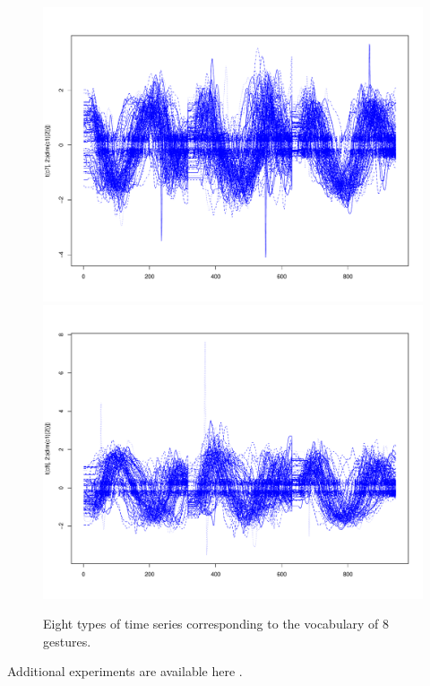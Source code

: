 \begin{figure}
\includegraphics[scale=0.1]{images/c7}
\includegraphics[scale=0.1]{images/c8}

\caption{Eight types of time series corresponding to the vocabulary of 8 gestures.}

\label{geste}
\end{figure}



 Additional experiments are available here \cite{Vanel}.


